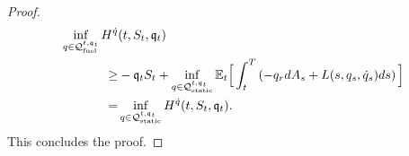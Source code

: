 \documentclass[10pt,a4paper]{article}
\begin{document}
\begin{proof}
\begin{equation*}
\begin{split}
\inf_{q\in \mathcal{Q}_{\text{fuel}}^{t,\mathfrak{q}_t}}
H^{\dot{q}} &(t,S_t,\mathfrak{q}_t)\\
\geq &
-\mathfrak{q}_t S_t
+ \inf_{q \in \mathcal{Q}_{\text{static}}^{t,\mathfrak{q}_t}}
\mathbb{{E}}_t \Big[
\int_{t}^{T} \left(-q_r dA_s + L(s,q_s,\dot{q}_s)ds \right)
\Big]\\
=&
\inf_{q \in \mathcal{Q}_{\text{static}}^{t,\mathfrak{q}_t}}
H^{\dot{q}} (t,S_t,\mathfrak{q}_t).
\end{split}
\end{equation*}
This concludes the proof. 
\end{proof}
\end{document}

